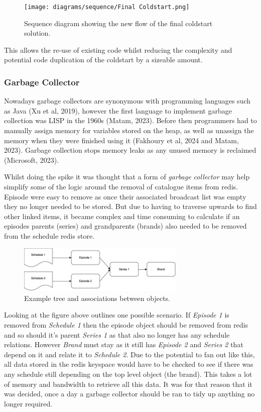   \begin{figure}[H]
    \centering
    \texttt{[image: diagrams/sequence/Final Coldstart.png]}
    \caption{Sequence diagram showing the new flow of the final coldstart solution.}
    \label{fig:finalColdstart}
  \end{figure}

  This allows the re-use of existing code whilst reducing the complexity and potential code duplication of the coldstart by a sizeable amount.

  \newpage
  \subsubsection{Garbage Collector}
  Nowadays garbage collectors are synonymous with programming languages such as Java (Xu et al, 2019), however the first language to implement garbage 
  collection was LISP in the 1960s (Matam, 2023). Before then programmers had to manually assign memory for variables stored on the heap, as well as 
  unassign the memory when they were finished using it (Fakhoury et al, 2024 and Matam, 2023). 
  Garbage collection stops memory leaks as any unused memory is reclaimed (Microsoft, 2023).

  Whilst doing the spike it was thought that a form of \textit{garbage collector} may help simplify some of the logic around the removal of catalogue items
  from redis. Episode were easy to remove as once their associated broadcast list was empty they no longer needed to be stored. But due to having to 
  traverse upwards to find other linked items, it became complex and time consuming to calculate if an episodes parents (series) and grandparents (brands)
  also needed to be removed from the schedule redis store.

  \begin{figure}[H]
    \centering
    \includegraphics[width=8cm]{assets/catalogueTree.drawio.png}
    \caption{Example tree and associations between objects.}
    \label{fig:catalogueTree}
  \end{figure}

  Looking at the figure above outlines one possible scenario. If \emph{Episode 1} is removed from \emph{Schedule 1} then the episode object should be removed
  from redis and so should it's parent \emph{Series 1} as that also no longer has any schedule relations. However \emph{Brand} must stay as it still
  has \emph{Episode 2} and \emph{Series 2} that depend on it and relate it to \emph{Schedule 2}. Due to the potential to fan out like this, all data stored
  in the redis keyspace would have to be checked to see if there was any schedule still depending on the top level object (the brand). This takes a lot of
  memory and bandwidth to retrieve all this data. It was for that reason that it was decided, once a day a garbage collector should be ran to 
  tidy up anything no longer required.

